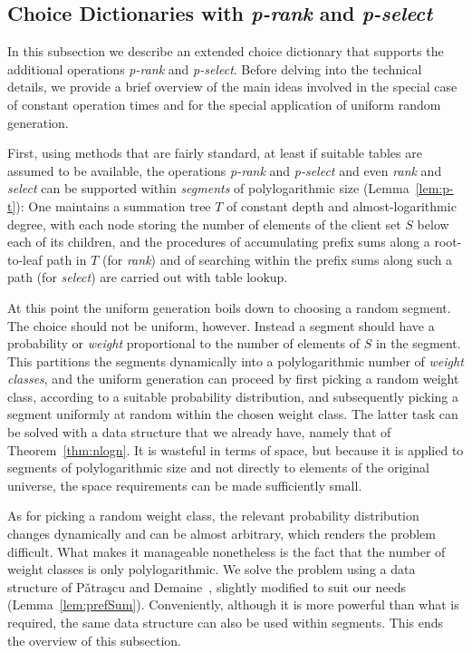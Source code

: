 \documentclass[envcountsame,envcountsect,undated,nolinenumbers]{lnthi}
\def\Tvn#1{\hbox{\textit{#1\/}}}
\begin{document}
\subsection{Choice Dictionaries with \Tvn{p-rank} and
 \Tvn{p-select}}
\label{subsec:random}

In this subsection we describe an extended choice
dictionary that supports the
additional operations
\Tvn{p-rank} and \Tvn{p-select}.
Before delving into the technical details, we
provide a brief overview of the main ideas
involved in the special case of constant
operation times and for the special application
of uniform random generation.

First, using methods that are fairly standard,
at least if suitable tables are assumed to be available,
the operations \Tvn{p-rank} and \Tvn{p-select} and
even \Tvn{rank} and \Tvn{select} can be supported
within \emph{segments} of
polylogarithmic size (Lemma~\ref{lem:p-t}):
One maintains a summation tree $T$ of constant depth
and almost-logarithmic degree, with each node storing the
number of elements of the client set $S$ below each
of its children, and the procedures of accumulating
prefix sums along a root-to-leaf path in $T$
(for \Tvn{rank}) and of searching within the
prefix sums along such a path (for \Tvn{select})
are carried out with table lookup.

At this point the uniform generation boils down
to choosing a random segment.
The choice should not be uniform, however.
Instead a segment should have a probability
or \emph{weight}
proportional to the number of elements of $S$
in the segment.
This partitions the segments
dynamically into a polylogarithmic
number of \emph{weight classes}, and the uniform
generation can proceed by first picking a 
random weight class, according to a suitable probability
distribution, and subsequently picking a segment
uniformly at random within the chosen weight class.
The latter task can be solved with a data structure
that we already have, namely that of Theorem~\ref{thm:nlogn}.
It is wasteful in terms of space, but
because it is applied to segments of
polylogarithmic size and not directly
to elements of the original universe, the space
requirements can be made sufficiently small.

As for picking a random weight class, the relevant
probability distribution changes dynamically and
can be almost arbitrary,
which renders the problem difficult.
What makes it manageable nonetheless is the fact
that the number of weight classes is only
polylogarithmic.
We solve the problem using a data structure of
P\v atra\c scu and Demaine~\cite{PatD06},
slightly modified to suit our needs
(Lemma~\ref{lem:prefSum}).
Conveniently, although it is more powerful
than what is required, the same data structure can also
be used within segments.
This ends the overview of this subsection.
\end{document}
